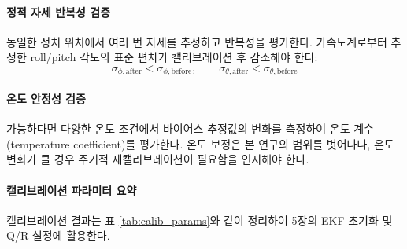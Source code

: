             \paragraph{정적 자세 반복성 검증}
                동일한 정치 위치에서 여러 번 자세를 추정하고 반복성을 평가한다. 가속도계로부터 추정한 roll/pitch 각도의 표준 편차가 캘리브레이션 후 감소해야 한다:\\

                \begin{equation}
                    \sigma_{\phi,\text{after}} < \sigma_{\phi,\text{before}}, \qquad \sigma_{\theta,\text{after}} < \sigma_{\theta,\text{before}}
                    \label{eq:static_repeatability}
                \end{equation}

            \paragraph{온도 안정성 검증}
                가능하다면 다양한 온도 조건에서 바이어스 추정값의 변화를 측정하여 온도 계수(temperature coefficient)를 평가한다. 온도 보정은 본 연구의 범위를 벗어나나, 온도 변화가 클 경우 주기적 재캘리브레이션이 필요함을 인지해야 한다.\\

            \paragraph{캘리브레이션 파라미터 요약}
                캘리브레이션 결과는 표 \ref{tab:calib_params}와 같이 정리하여 5장의 EKF 초기화 및 Q/R 설정에 활용한다.\\

